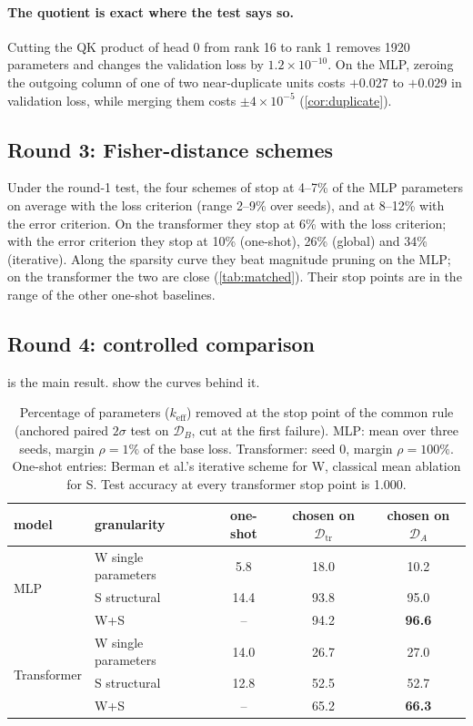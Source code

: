 \documentclass[11pt,a4paper]{article}
\theoremstyle{definition}
\newcommand{\D}{\mathcal{D}}
\newcommand{\keff}{k_{\mathrm{eff}}}
\newcommand{\Dtr}{\D_{\mathrm{tr}}}
\newcommand{\DA}{\D_{A}}
\newcommand{\DB}{\D_{B}}
\newcommand{\WS}{\textsf{W+S}}
\newcommand{\Wo}{\textsf{W}}
\newcommand{\So}{\textsf{S}}
\begin{document}
\paragraph{The quotient is exact where the test says so.} Cutting the QK product of head 0
from rank 16 to rank 1 removes 1920 parameters and changes the validation loss by
$1.2\times10^{-10}$. On the MLP, zeroing the outgoing column of one of two near-duplicate
units costs $+0.027$ to $+0.029$ in validation loss, while merging them costs
$\pm4\times10^{-5}$ (\cref{cor:duplicate}).

\subsection{Round 3: Fisher-distance schemes}
\label{sec:res-berman}

Under the round-1 test, the four schemes of \citet{berman2026fdist} stop at 4--7\% of
the MLP parameters on average with the loss criterion (range 2--9\% over seeds), and at
8--12\% with the error criterion. On the transformer they stop at 6\% with the loss
criterion; with the error criterion they stop at 10\% (one-shot), 26\% (global) and 34\%
(iterative). Along the sparsity curve they beat magnitude pruning on the MLP; on the
transformer the two are close (\cref{tab:matched}). Their stop points are in the range of
the other one-shot baselines.

\subsection{Round 4: controlled comparison}
\label{sec:res-fair}

 is the main result.  show the curves behind it.

\begin{table}[t]
\centering\small
\caption{Percentage of parameters ($\keff$) removed at the stop point of the common rule
(anchored paired $2\sigma$ test on $\DB$, cut at the first failure). MLP: mean over three
seeds, margin $\rho=1\%$ of the base loss. Transformer: seed 0, margin $\rho=100\%$.
One-shot entries: Berman et al.'s iterative scheme for \Wo, classical mean ablation for
\So. Test accuracy at every transformer stop point is 1.000.}
\label{tab:fair}
\begin{tabular}{@{}llccc@{}}
\toprule
model & granularity & one-shot & chosen on $\Dtr$ & chosen on $\DA$\\
\midrule
\multirow{3}{*}{MLP} & \Wo{} single parameters & 5.8 & 18.0 & 10.2\\
& \So{} structural & 14.4 & 93.8 & 95.0\\
& \WS{} & -- & 94.2 & \textbf{96.6}\\
\midrule
\multirow{3}{*}{Transformer} & \Wo{} single parameters & 14.0 & 26.7 & 27.0\\
& \So{} structural & 12.8 & 52.5 & 52.7\\
& \WS{} & -- & 65.2 & \textbf{66.3}\\
\bottomrule
\end{tabular}
\end{table}
\end{document}
